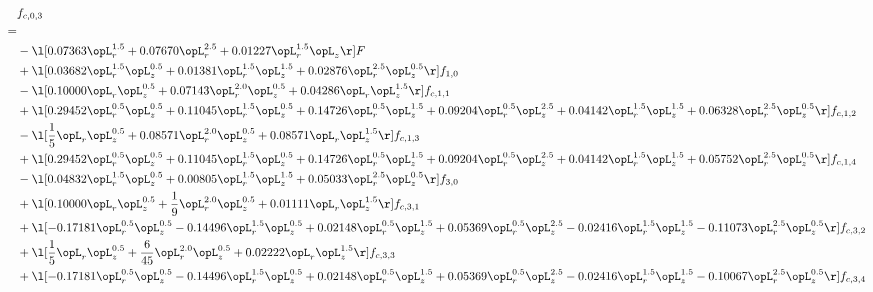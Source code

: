 \begin{alignat}{2} 
\label{eq:f_03_1} 
& f_{c,0,3} \nonumber \\ 
 = \\ 
& - \l[  0.07363 \opL_r^{1.5} +  0.07670 \opL_r^{2.5} +  0.01227 \opL_r^{1.5} \opL_z  \r] F \nonumber \\ 
& + \l[  0.03682 \opL_r^{1.5} \opL_z^{0.5} +  0.01381 \opL_r^{1.5} \opL_z^{1.5} +  0.02876 \opL_r^{2.5} \opL_z^{0.5}  \r] f_{1,0} \nonumber \\ 
& - \l[  0.10000 \opL_r \opL_z^{0.5} +  0.07143 \opL_r^{2.0} \opL_z^{0.5} +  0.04286 \opL_r \opL_z^{1.5}  \r] f_{c,1,1} \nonumber \\ 
& + \l[  0.29452 \opL_r^{0.5} \opL_z^{0.5} +  0.11045 \opL_r^{1.5} \opL_z^{0.5} +  0.14726 \opL_r^{0.5} \opL_z^{1.5} +  0.09204 \opL_r^{0.5} \opL_z^{2.5} +  0.04142 \opL_r^{1.5} \opL_z^{1.5} +  0.06328 \opL_r^{2.5} \opL_z^{0.5}  \r] f_{c,1,2} \nonumber \\ 
& - \l[ \frac{1}{5} \opL_r \opL_z^{0.5} +  0.08571 \opL_r^{2.0} \opL_z^{0.5} +  0.08571 \opL_r \opL_z^{1.5}  \r] f_{c,1,3} \nonumber \\ 
& + \l[  0.29452 \opL_r^{0.5} \opL_z^{0.5} +  0.11045 \opL_r^{1.5} \opL_z^{0.5} +  0.14726 \opL_r^{0.5} \opL_z^{1.5} +  0.09204 \opL_r^{0.5} \opL_z^{2.5} +  0.04142 \opL_r^{1.5} \opL_z^{1.5} +  0.05752 \opL_r^{2.5} \opL_z^{0.5}  \r] f_{c,1,4} \nonumber \\ 
& - \l[  0.04832 \opL_r^{1.5} \opL_z^{0.5} +  0.00805 \opL_r^{1.5} \opL_z^{1.5} +  0.05033 \opL_r^{2.5} \opL_z^{0.5}  \r] f_{3,0} \nonumber \\ 
& + \l[  0.10000 \opL_r \opL_z^{0.5} + \frac{1}{9} \opL_r^{2.0} \opL_z^{0.5} +  0.01111 \opL_r \opL_z^{1.5}  \r] f_{c,3,1} \nonumber \\ 
& + \l[  -0.17181 \opL_r^{0.5} \opL_z^{0.5}   -0.14496 \opL_r^{1.5} \opL_z^{0.5} +  0.02148 \opL_r^{0.5} \opL_z^{1.5} +  0.05369 \opL_r^{0.5} \opL_z^{2.5}   -0.02416 \opL_r^{1.5} \opL_z^{1.5}   -0.11073 \opL_r^{2.5} \opL_z^{0.5}  \r] f_{c,3,2} \nonumber \\ 
& + \l[ \frac{1}{5} \opL_r \opL_z^{0.5} + \frac{6}{45} \opL_r^{2.0} \opL_z^{0.5} +  0.02222 \opL_r \opL_z^{1.5}  \r] f_{c,3,3} \nonumber \\ 
& + \l[  -0.17181 \opL_r^{0.5} \opL_z^{0.5}   -0.14496 \opL_r^{1.5} \opL_z^{0.5} +  0.02148 \opL_r^{0.5} \opL_z^{1.5} +  0.05369 \opL_r^{0.5} \opL_z^{2.5}   -0.02416 \opL_r^{1.5} \opL_z^{1.5}   -0.10067 \opL_r^{2.5} \opL_z^{0.5}  \r] f_{c,3,4} \nonumber \\ 

\end{alignat}
